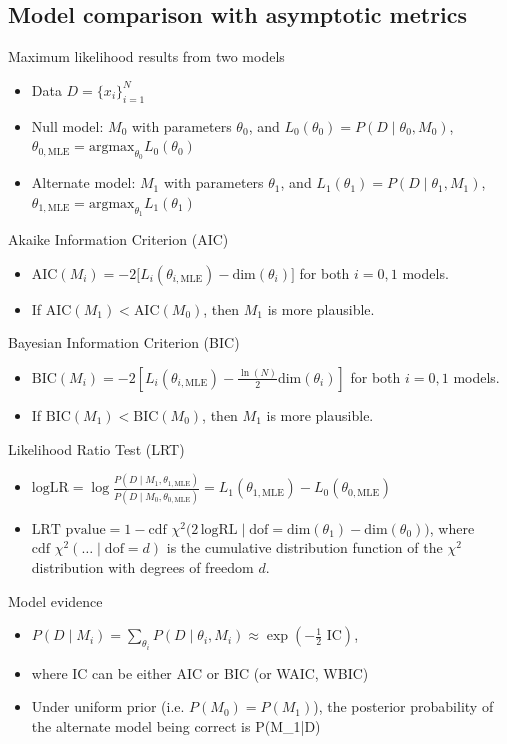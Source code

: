 \subsection{Model comparison with asymptotic metrics}
\no Maximum likelihood results from two models
\begin{itemize}
	\item Data $D = \{x_i\}_{i=1}^N$
	\item Null model: \hspace{6.5mm} $M_0$ with parameters $\theta_0$, and $L_0(\theta_0) = P(D\;|\;\theta_0, M_0)$, \;$\theta_{0, \text{MLE}} = \text{argmax}_{\theta_0} L_0(\theta_0)$
	\item Alternate model: $M_1$ with parameters $\theta_1$, and $L_1(\theta_1) = P(D\;|\;\theta_1, M_1)$, \;$\theta_{1, \text{MLE}} = \text{argmax}_{\theta_1} L_1(\theta_1)$
\end{itemize}
Akaike Information Criterion (AIC)
\begin{itemize}
	\item $\text{AIC}(M_i) = -2\Big[L_i(\theta_{i,\text{MLE}}) - \text{dim}(\theta_i)\Big]$ for both $i=0, 1$ models.
	\item If $\text{AIC}(M_1) < \text{AIC}(M_0)$, then $M_1$  is more plausible.
\end{itemize}
Bayesian Information Criterion (BIC)
\begin{itemize}
	\item $\text{BIC}(M_i) = -2\left[L_i(\theta_{i,\text{MLE}}) - \frac{\ln(N)}{2}\text{dim}(\theta_i)\right]$ for both $i=0, 1$ models.
	\item If $\text{BIC}(M_1) < \text{BIC}(M_0)$, then $M_1$  is more plausible.
\end{itemize}
Likelihood Ratio Test (LRT)
\begin{itemize}
	\item $\text{logLR} = \log\frac{P(D\;|\;M_1, \theta_{1,\text{MLE}})}{P(D\;|\;M_0, \theta_{0,\text{MLE}})} = L_1(\theta_{1,\text{MLE}}) - L_0(\theta_{0,\text{MLE}})$
	\item $\text{LRT pvalue} = 1 - \text{cdf }\chi^2\Big(2\,\text{logRL}\;\Big|\;\text{dof} = \text{dim}(\theta_1) - \text{dim}(\theta_0)\Big)$, where $\text{cdf }\chi^2(\ldots\;|\;\text{dof}=d)$ is the cumulative distribution function of the $\chi^2$ distribution with degrees of freedom $d$.
\end{itemize}
Model evidence
\begin{itemize}
	\item $P(D\;|\;M_i) = \sum_{\theta_i} P(D\;|\;\theta_i, M_i) \approx \exp\left(-\frac{1}{2} \text{ IC}\right)$, 
	\item where IC can be either AIC or BIC (or WAIC, WBIC)
	\item Under uniform prior (i.e. $P(M_0) = P(M_1)$), the posterior probability of the alternate model being correct is
		\be
			 P(M_1\;|\;D) \approx {}
		\ee
\end{itemize}

